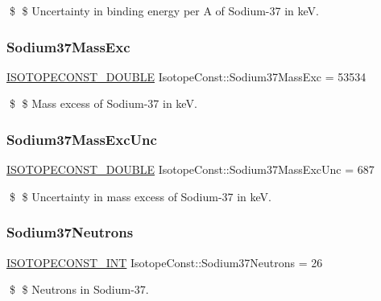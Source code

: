 \$ \$ Uncertainty in binding energy per A of Sodium-\/37 in keV. \mbox{\label{group___isotope_const-_sodium-_na37_gaceaaf7e2fc609d8f1e7f5c461ec3d171}} 
\subsubsection{\texorpdfstring{Sodium37\+Mass\+Exc}{Sodium37MassExc}}
{\footnotesize\ttfamily \mbox{\hyperlink{group___isotope_const-_macros_ga8f45a7272ce02c0b4c65c44636ed719a}{I\+S\+O\+T\+O\+P\+E\+C\+O\+N\+S\+T\+\_\+\+D\+O\+U\+B\+LE}} Isotope\+Const\+::\+Sodium37\+Mass\+Exc = 53534}

\$ \$ Mass excess of Sodium-\/37 in keV. \mbox{\label{group___isotope_const-_sodium-_na37_gabfd537517d3cb0e76c3d161295430f16}} 
\subsubsection{\texorpdfstring{Sodium37\+Mass\+Exc\+Unc}{Sodium37MassExcUnc}}
{\footnotesize\ttfamily \mbox{\hyperlink{group___isotope_const-_macros_ga8f45a7272ce02c0b4c65c44636ed719a}{I\+S\+O\+T\+O\+P\+E\+C\+O\+N\+S\+T\+\_\+\+D\+O\+U\+B\+LE}} Isotope\+Const\+::\+Sodium37\+Mass\+Exc\+Unc = 687}

\$ \$ Uncertainty in mass excess of Sodium-\/37 in keV. \mbox{\label{group___isotope_const-_sodium-_na37_ga4e99f0a91daca3e8f0f4841bedc4acd6}} 
\subsubsection{\texorpdfstring{Sodium37\+Neutrons}{Sodium37Neutrons}}
{\footnotesize\ttfamily \mbox{\hyperlink{group___isotope_const-_macros_ga5f18360b3e99483a35c32d789e62621c}{I\+S\+O\+T\+O\+P\+E\+C\+O\+N\+S\+T\+\_\+\+I\+NT}} Isotope\+Const\+::\+Sodium37\+Neutrons = 26}

\$ \$ Neutrons in Sodium-\/37. \mbox{\label{group___isotope_const-_sodium-_na37_ga2a98a7717f7478527d21cc03a9606cd2}} 
